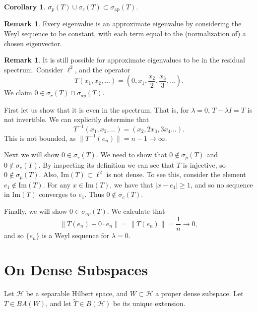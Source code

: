 \documentclass{dcthesis}
\numberwithin{equation}{section}
\numberwithin{equation}{section}
\theoremstyle{definition}
\newtheorem{corollary}[equation]{Corollary}
\newtheorem{remark}[equation]{Remark}
\begin{document}
\begin{corollary}
	$\sigma_p(T) \cup \sigma_c(T) \subset \sigma_{\text{ap}}(T)$.
\end{corollary}

\begin{remark}
\label{rmk_eigenvalues_are_approximate}
	Every eigenvalue is an approximate eigenvalue by considering the Weyl sequence to be constant, with each term equal to the (normalization of) a chosen eigenvector.
\end{remark}

\begin{remark}
	It is still possible for approximate eigenvalues to be in the residual spectrum. Consider $\ell^2$, and the operator
\begin{equation*}
	T(x_1,x_2,\dots)=(0,x_1,\frac{x_2}{2},\frac{x_3}{3},\dots).
\end{equation*}
We claim $0\in\sigma_r(T)\cap\sigma_{ap}(T)$. 

	First let us show that it is even in the spectrum. That is, for $\lambda=0$, $T-\lambda I=T$ is not invertible. We can explicitly determine that
\begin{equation*}
	T^{-1}(x_1,x_2,\dots) = (x_2, 2x_3, 3x_4 \dots).
\end{equation*}
This is not bounded, as $\|T^{-1}(e_n)\| = n-1 \to \infty$.

	Next we will show $0\in\sigma_r(T)$. We need to show that $0\not\in\sigma_p(T)$ and $0\not\in\sigma_c(T)$. By inspecting its definition we can see that $T$ is injective, so $0\not\in\sigma_p(T)$. Also, $\text{Im}(T)\subset\ell^2$ is not dense. To see this, consider the element $e_1\not\in\text{Im}(T)$. For any $x\in\text{Im}(T)$, we have that $|x-e_1|\geq 1$, and so no sequence in $\text{Im}(T)$ converges to $e_1$. Thus $0\not\in\sigma_c(T)$. 

	Finally, we will show $0\in\sigma_{ap}(T)$. We calculate that 
	\begin{equation*}
		\|T(e_n) - 0\cdot e_n\| = \|T(e_n)\| = \frac{1}{n}\to 0,
	\end{equation*}
	and so $\{e_n\}$ is a Weyl sequence for $\lambda=0$.
\end{remark}


\section{On Dense Subspaces} %

Let $\mathcal{H}$ be a separable Hilbert space, and $W\subset\mathcal{H}$ a proper dense subspace. Let $T\in BA(W)$, and let $\tilde{T}\in B(\mathcal{H})$ be its unique extension.
\end{document}
